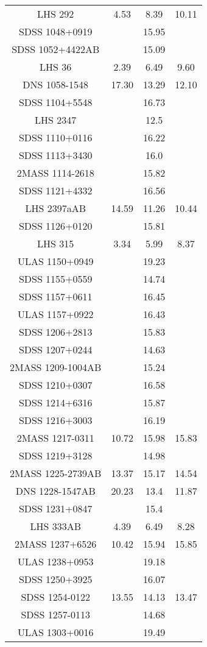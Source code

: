 \begin{table}
\begin{tabular}{cccc}
LHS 292 & 4.53 & 8.39 & 10.11 \\
SDSS 1048+0919 &  & 15.95 &  \\
SDSS 1052+4422AB &  & 15.09 &  \\
LHS 36 & 2.39 & 6.49 & 9.60 \\
DNS 1058-1548 & 17.30 & 13.29 & 12.10 \\
SDSS 1104+5548 &  & 16.73 &  \\
LHS 2347 &  & 12.5 &  \\
SDSS 1110+0116 &  & 16.22 &  \\
SDSS 1113+3430 &  & 16.0 &  \\
2MASS 1114-2618 &  & 15.82 &  \\
SDSS 1121+4332 &  & 16.56 &  \\
LHS 2397aAB & 14.59 & 11.26 & 10.44 \\
SDSS 1126+0120 &  & 15.81 &  \\
LHS 315 & 3.34 & 5.99 & 8.37 \\
ULAS 1150+0949 &  & 19.23 &  \\
SDSS 1155+0559 &  & 14.74 &  \\
SDSS 1157+0611 &  & 16.45 &  \\
ULAS 1157+0922 &  & 16.43 &  \\
SDSS 1206+2813 &  & 15.83 &  \\
SDSS 1207+0244 &  & 14.63 &  \\
2MASS 1209-1004AB &  & 15.24 &  \\
SDSS 1210+0307 &  & 16.58 &  \\
SDSS 1214+6316 &  & 15.87 &  \\
SDSS 1216+3003 &  & 16.19 &  \\
2MASS 1217-0311 & 10.72 & 15.98 & 15.83 \\
SDSS 1219+3128 &  & 14.98 &  \\
2MASS 1225-2739AB & 13.37 & 15.17 & 14.54 \\
DNS 1228-1547AB & 20.23 & 13.4 & 11.87 \\
SDSS 1231+0847 &  & 15.4 &  \\
LHS 333AB & 4.39 & 6.49 & 8.28 \\
2MASS 1237+6526 & 10.42 & 15.94 & 15.85 \\
ULAS 1238+0953 &  & 19.18 &  \\
SDSS 1250+3925 &  & 16.07 &  \\
SDSS 1254-0122 & 13.55 & 14.13 & 13.47 \\
SDSS 1257-0113 &  & 14.68 &  \\
ULAS 1303+0016 &  & 19.49 &  \\

\end{tabular}
\end{table}
